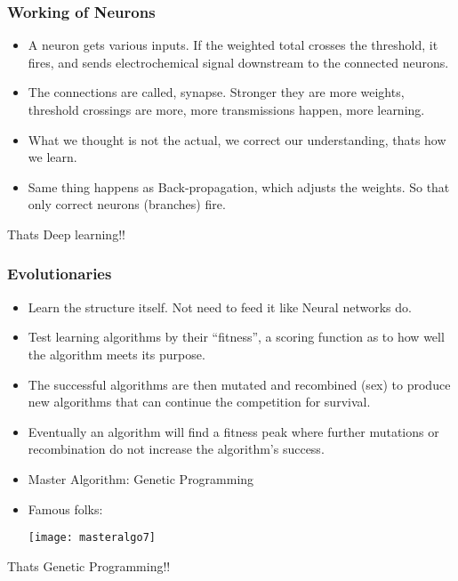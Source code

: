 \begin{frame}[fragile]\frametitle{Working of Neurons}
  \begin{itemize}
	\item A neuron gets various inputs. If the weighted total crosses the threshold, it fires, and sends electrochemical signal downstream to the connected neurons.
	\item The connections are called, synapse. Stronger they are more weights, threshold crossings are  more, more transmissions happen, more learning.
	\item What we thought is not the actual, we correct our understanding, thats how we learn.
	\item Same thing happens as Back-propagation, which adjusts the weights. So that only correct neurons (branches) fire.
	
  \end{itemize}

Thats Deep learning!!
\end{frame}


\begin{frame}[fragile]\frametitle{Evolutionaries}
  \begin{itemize}
    \item Learn the structure itself. Not need to feed it like Neural networks do.
	\item Test learning algorithms by their “fitness”, a scoring function as to how well the algorithm meets its purpose.
	\item The successful algorithms are then mutated and recombined (sex) to produce new algorithms that can continue the competition for survival. 
	\item Eventually an algorithm will find a fitness peak where further mutations or recombination do not increase the algorithm’s success.
	\item Master Algorithm: Genetic Programming
	
	\item Famous folks:
	
	 \begin{center}
\texttt{[image: masteralgo7]}
\end{center}	
  \end{itemize}

Thats Genetic Programming!!

\end{frame}

